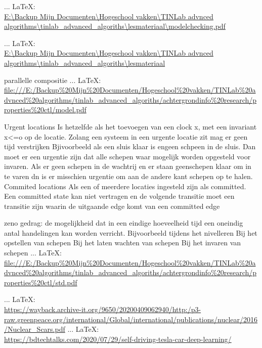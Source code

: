 \begin{thebibliography}{99}
{{ ... \LaTeX:\\ \url{E:\Backup Mijn Documenten\Hogeschool vakken\TINLab advnced algorithms\tinlab_advanced_algoriths\lesmateriaal\modelchecking.pdf}





 ... \LaTeX:\\ \url{E:\Backup Mijn Documenten\Hogeschool vakken\TINLab advnced algorithms\tinlab_advanced_algoriths\lesmateriaal}

parallelle compositie
 ... \LaTeX:\\ \url{file:///E:/Backup%20Mijn%20Documenten/Hogeschool%20vakken/TINLab%20advnced%20algorithms/tinlab_advanced_algoriths/achtergrondinfo%20research/properties%20ctl/model.pdf}

Urgent locations
Is hetzelfde als het toevoegen van een clock x, met een invariant x<=o op de locatie. Zolang een systeem in een urgente locatie zit mag er geen tijd verstrijken
Bjivoorbeeld als een sluis klaar is engeen schpeen in de sluis. Dan moet er een urgentie zijn dat alle schepen waar mogelijk worden opgesteld voor invaren. Als er geen schepen in de wachtrij en er staan geenschepen klaar om in te varen dn is er misschien urgentie om aan de andere kant schepen op te halen.
Commited locations
Als een of meerdere locaties ingesteld zijn als committed. Een committed state kan niet vertragen  en de volgende transitie moet een transitie zijn waarin de uitgaande edge komt van een committed edge


zeno gedrag: de mogelijkheid dat in een eindige hoeveelheid tijd een oneindig antal handelingen kan worden verricht.
Bijvoorbeeld tijdens het nivelleren
Bij het opstellen van schepen
Bij het laten wachten van schepen
Bij het invaren van schepen
 ... \LaTeX:\\ \url{file:///E:/Backup%20Mijn%20Documenten/Hogeschool%20vakken/TINLab%20advnced%20algorithms/tinlab_advanced_algoriths/achtergrondinfo%20research/properties%20ctl/std.pdf}



 ... \LaTeX:\\ \url{https://wayback.archive-it.org/9650/20200409062940/http:/p3-raw.greenpeace.org/international/Global/international/publications/nuclear/2016/Nuclear_Scars.pdf}
 ... \LaTeX:\\ \url{https://bdtechtalks.com/2020/07/29/self-driving-tesla-car-deep-learning/}



}}
\end{thebibliography}
